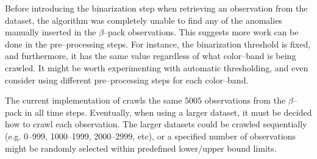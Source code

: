Before introducing the binarization step when retrieving an observation from the dataset, the \mlblink algorithm was completely unable to find any of the anomalies manually inserted in the $\beta$--pack observations. This suggests more work can be done in the pre--processing steps. For instance, the binarization threshold is fixed, and furthermore, it has the same value regardless of what \panstarrs color--band is being crawled. It might be worth experimenting with automatic thresholding, and even consider using different pre--processing steps for each color--band. \newline

The current implementation of \mlblink crawls the same $5005$ observations from the $\beta$--pack in all time steps. Eventually, when using a larger dataset, it must be decided how to crawl each observation. The larger datasets could be crawled sequentially (e.g. 0--999, 1000--1999, 2000--2999, etc), or a specified number of observations might be randomly selected within predefined lower/upper bound limits. \newline

